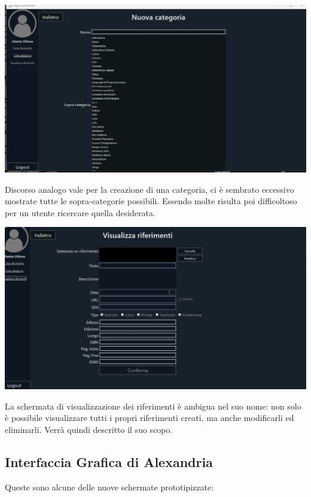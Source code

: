         \begin{center}
            \includegraphics[width=.80\textwidth]{Immagini/VecchioProgetto/crea categoria.jpg} 
        \end{center}

Discorso analogo vale per la creazione di una categoria, ci è sembrato eccessivo mostrate tutte le sopra-categorie possibili. Essendo molte risulta poi difficoltoso per un utente ricercare quella desiderata.

        \begin{center}
            \includegraphics[width=.80\textwidth]{Immagini/VecchioProgetto/visualizza riferimenti.jpg} 
        \end{center}
        
La schermata di visualizzazione dei riferimenti è ambigua nel suo nome: non solo è possibile visualizzare tutti i propri riferimenti creati, ma anche modificarli ed eliminarli. Verrà quindi descritto il suo scopo.
\raggedright{\subsection{Interfaccia Grafica di Alexandria}}
Queste sono alcune delle nuove schermate prototipizzate:
\newpage

